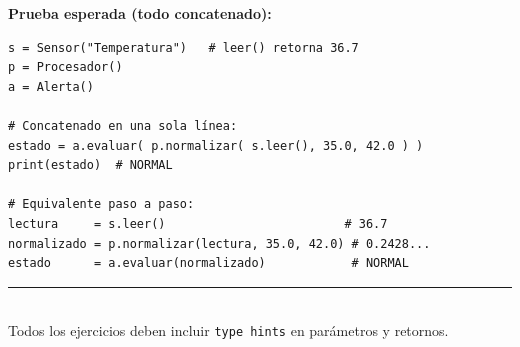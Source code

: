 \documentclass[11pt,letterpaper]{article}
\begin{document}
\textbf{Prueba esperada (todo concatenado):}
\begin{lstlisting}
s = Sensor("Temperatura")   # leer() retorna 36.7
p = Procesador()
a = Alerta()

# Concatenado en una sola línea:
estado = a.evaluar( p.normalizar( s.leer(), 35.0, 42.0 ) )
print(estado)  # NORMAL

# Equivalente paso a paso:
lectura     = s.leer()                         # 36.7
normalizado = p.normalizar(lectura, 35.0, 42.0) # 0.2428...
estado      = a.evaluar(normalizado)            # NORMAL
\end{lstlisting}

\vspace{1cm}
\begin{center}
  \rule{.4\textwidth}{.4pt}\\[6pt]
  {\small\color{cm} Todos los ejercicios deben incluir \texttt{type hints} en parámetros y retornos.}
\end{center}
\end{document}
